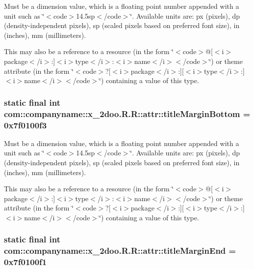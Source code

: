 Must be a dimension value, which is a floating point number appended with a unit such as \char`\"{}$<$code$>$14.5sp$<$/code$>$\char`\"{}. Available units are: px (pixels), dp (density-independent pixels), sp (scaled pixels based on preferred font size), in (inches), mm (millimeters). 

This may also be a reference to a resource (in the form \char`\"{}$<$code$>$@\mbox{[}$<$i$>$package$<$/i$>$:\mbox{]}$<$i$>$type$<$/i$>$:$<$i$>$name$<$/i$>$$<$/code$>$\char`\"{}) or theme attribute (in the form \char`\"{}$<$code$>$?\mbox{[}$<$i$>$package$<$/i$>$:\mbox{]}\mbox{[}$<$i$>$type$<$/i$>$:\mbox{]}$<$i$>$name$<$/i$>$$<$/code$>$\char`\"{}) containing a value of this type. \hypertarget{classcom_1_1companyname_1_1x__2doo_1_1_r_1_1attr_3ea062127ccb277197dfc6e078435b34}{
\subsubsection[{titleMarginBottom}]{\setlength{\rightskip}{0pt plus 5cm}static final int com::companyname::x\_\-2doo.R.R::attr::titleMarginBottom = 0x7f0100f3}}
\label{classcom_1_1companyname_1_1x__2doo_1_1_r_1_1attr_3ea062127ccb277197dfc6e078435b34}


Must be a dimension value, which is a floating point number appended with a unit such as \char`\"{}$<$code$>$14.5sp$<$/code$>$\char`\"{}. Available units are: px (pixels), dp (density-independent pixels), sp (scaled pixels based on preferred font size), in (inches), mm (millimeters). 

This may also be a reference to a resource (in the form \char`\"{}$<$code$>$@\mbox{[}$<$i$>$package$<$/i$>$:\mbox{]}$<$i$>$type$<$/i$>$:$<$i$>$name$<$/i$>$$<$/code$>$\char`\"{}) or theme attribute (in the form \char`\"{}$<$code$>$?\mbox{[}$<$i$>$package$<$/i$>$:\mbox{]}\mbox{[}$<$i$>$type$<$/i$>$:\mbox{]}$<$i$>$name$<$/i$>$$<$/code$>$\char`\"{}) containing a value of this type. \hypertarget{classcom_1_1companyname_1_1x__2doo_1_1_r_1_1attr_b4cc2c5b20355d90648de083289a42b4}{
\subsubsection[{titleMarginEnd}]{\setlength{\rightskip}{0pt plus 5cm}static final int com::companyname::x\_\-2doo.R.R::attr::titleMarginEnd = 0x7f0100f1}}
\label{classcom_1_1companyname_1_1x__2doo_1_1_r_1_1attr_b4cc2c5b20355d90648de083289a42b4}


